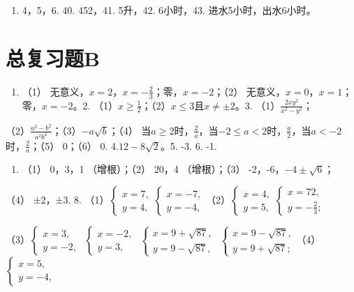 \begin{enumerate}[start=39]
\item
  4，5，6. 40. 452，41. 5升，42. 6小时，43. 进水5小时，出水6小时。
\end{enumerate}

\section{总复习题B}

\begin{enumerate}
\item
  （1） 无意义，\(x = 2\)，\(x = -\frac{2}{3}\)；零，\(x = -2\)；（2）
  无意义，\(x = 0\)，\(x = 1\)；零，\(x = -2\)。2.
  （1）\(x \geqslant \frac{1}{2}\)；（2）\(x \leqslant 3\)且\(x \neq \pm 2\)。3.
  （1）\(\frac{2xy^2}{x^2 - y^2}\)；
\end{enumerate}

（2）\(\frac{a^2 - b^2}{a^2b^2}\)；（3）\(-a\sqrt{b}\)；（4）
当\(a \geqslant 2\)时，\(\frac{2}{a}\)，当\(-2 \leqslant a < 2\)时，\(\frac{a}{2}\)，当\(a < -2\)时，\(\frac{2}{a}\)；（5）
0；（6） 0. 4.\(12 - 8\sqrt{2}\)。5. -3. 6. -1.

\begin{enumerate}[start=7]
\item
  （1） 0，3，1 （增根）；（2） 20，4 （增根）；（3）
  -2，-6，\(-4 \pm \sqrt{6}\)；
\end{enumerate}

（4） ±2，±3. 8.
（1）\(\left\{\begin{aligned}x=7,\\ y=4,\end{aligned}\right.\left\{\begin{aligned}x=-7,\\ y=-4,\end{aligned}\right.\)（2）\(\left\{\begin{aligned}x=4,\\ y=5,\end{aligned}\right.\left\{\begin{aligned}x=72,\\ y=-\frac{2}{3};\end{aligned}\right.\)

（3）\(\left\{ \begin{array}{l} x = 3, \\ y = -2, \end{array} \right.\) \(\left\{ \begin{array}{l} x = -2, \\ y = 3, \end{array} \right.\) \(\left\{ \begin{array}{l} x = 9 + \sqrt{87}, \\ y = 9 - \sqrt{87}, \end{array} \right.\) \(\left\{ \begin{array}{l} x = 9 - \sqrt{87}, \\ y = 9 + \sqrt{87}; \end{array} \right.\)（4）\(\left\{ \begin{array}{l} x = 5, \\ y = -4, \end{array} \right.\)


